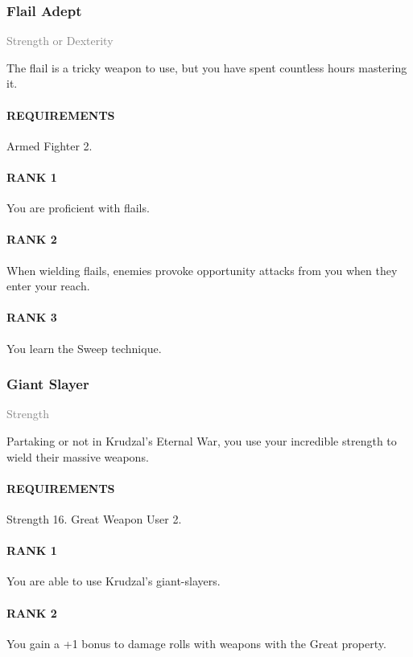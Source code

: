 \subsubsection{Flail Adept} \label{feat::flailadept}
\small{\textcolor{gray}{Strength or Dexterity}}

\normalsize
The flail is a tricky weapon to use, but you have spent countless hours mastering it.
\paragraph{REQUIREMENTS} Armed Fighter 2.
\paragraph{RANK 1} You are proficient with flails.
\paragraph{RANK 2} When wielding flails, enemies provoke opportunity attacks from you when they enter your reach.
\paragraph{RANK 3} You learn the Sweep technique.

\subsubsection{Giant Slayer} \label{feat::giantslayer}
\small{\textcolor{gray}{Strength}}

\normalsize
Partaking or not in Krudzal's Eternal War, you use your incredible strength to wield their massive weapons.
\paragraph{REQUIREMENTS} Strength 16. Great Weapon User 2.
\paragraph{RANK 1} You are able to use Krudzal's giant-slayers.
\paragraph{RANK 2} You gain a +1 bonus to damage rolls with weapons with the Great property.

